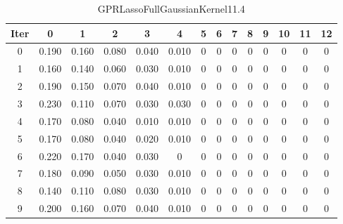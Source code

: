\begin{table}
	\begin{center}
		\begin{tabular}{|c|c|c|c|c|c|c|c|c|c|c|c|c|c|}
			\hline
			Iter & 0 & 1 & 2 & 3 & 4 & 5 & 6 & 7 & 8 & 9 & 10 & 11 & 12 \\
			\hline
			0 & 0.190 & 0.160 & 0.080 & 0.040 & 0.010 & 0 & 0 & 0 & 0 & 0 & 0 & 0 & 0 \\
			\hline
			1 & 0.160 & 0.140 & 0.060 & 0.030 & 0.010 & 0 & 0 & 0 & 0 & 0 & 0 & 0 & 0 \\
			\hline
			2 & 0.190 & 0.150 & 0.070 & 0.040 & 0.010 & 0 & 0 & 0 & 0 & 0 & 0 & 0 & 0 \\
			\hline
			3 & 0.230 & 0.110 & 0.070 & 0.030 & 0.030 & 0 & 0 & 0 & 0 & 0 & 0 & 0 & 0 \\
			\hline
			4 & 0.170 & 0.080 & 0.040 & 0.010 & 0.010 & 0 & 0 & 0 & 0 & 0 & 0 & 0 & 0 \\
			\hline
			5 & 0.170 & 0.080 & 0.040 & 0.020 & 0.010 & 0 & 0 & 0 & 0 & 0 & 0 & 0 & 0 \\
			\hline
			6 & 0.220 & 0.170 & 0.040 & 0.030 & 0 & 0 & 0 & 0 & 0 & 0 & 0 & 0 & 0 \\
			\hline
			7 & 0.180 & 0.090 & 0.050 & 0.030 & 0.010 & 0 & 0 & 0 & 0 & 0 & 0 & 0 & 0 \\
			\hline
			8 & 0.140 & 0.110 & 0.080 & 0.030 & 0.010 & 0 & 0 & 0 & 0 & 0 & 0 & 0 & 0 \\
			\hline
			9 & 0.200 & 0.160 & 0.070 & 0.040 & 0.010 & 0 & 0 & 0 & 0 & 0 & 0 & 0 & 0 \\
			\hline
		\end{tabular}
	\end{center}
	\caption{GPRLassoFullGaussianKernel11.4}
\end{table}